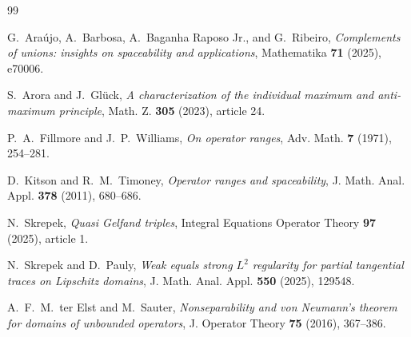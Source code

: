 \documentclass[11pt]{article}
\begin{document}
\begingroup
\raggedright
\scriptsize
\begin{thebibliography}{99}
\setlength{\itemsep}{0.25em}
\setlength{\parskip}{0pt}

G.~Ara\'ujo, A.~Barbosa, A.~Baganha Raposo Jr., and G.~Ribeiro,
\emph{Complements of unions: insights on spaceability and applications},
Mathematika \textbf{71} (2025), e70006.

S.~Arora and J.~Gl\"uck,
\emph{A characterization of the individual maximum and anti-maximum principle},
Math. Z. \textbf{305} (2023), article 24.

P.~A.~Fillmore and J.~P.~Williams,
\emph{On operator ranges},
Adv. Math. \textbf{7} (1971), 254--281.

D.~Kitson and R.~M.~Timoney,
\emph{Operator ranges and spaceability},
J. Math. Anal. Appl. \textbf{378} (2011), 680--686.

N.~Skrepek,
\emph{Quasi Gelfand triples},
Integral Equations Operator Theory \textbf{97} (2025), article 1.

N.~Skrepek and D.~Pauly,
\emph{Weak equals strong \(L^2\) regularity for partial tangential traces on Lipschitz domains},
J. Math. Anal. Appl. \textbf{550} (2025), 129548.

A.~F.~M.~ter Elst and M.~Sauter,
\emph{Nonseparability and von Neumann's theorem for domains of unbounded operators},
J. Operator Theory \textbf{75} (2016), 367--386.

\end{thebibliography}
\endgroup
\end{document}
